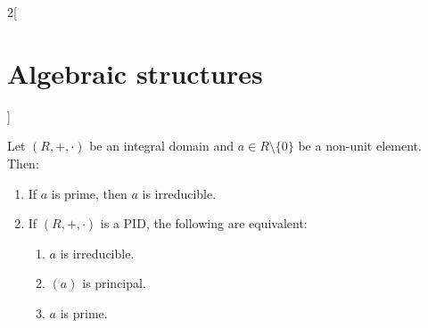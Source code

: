 \documentclass[../../../main.tex]{subfiles}
\begin{document}
\begin{multicols}{2}[\section{Algebraic structures}]
\begin{definition}
\end{definition}
\begin{prop}
    Let $(R,+,\cdot)$ be an integral domain and $a\in R\setminus\{0\}$ be a non-unit element. Then:
    \begin{enumerate}
        \item If $a$ is prime, then $a$ is irreducible.
        \item If $(R,+,\cdot)$ is a PID, the following are equivalent:
        \begin{enumerate}
            \item $a$ is irreducible.
            \item $(a)$ is principal.
            \item $a$ is prime.
        \end{enumerate}
    \end{enumerate}
\end{prop}
\end{multicols}
\end{document}
